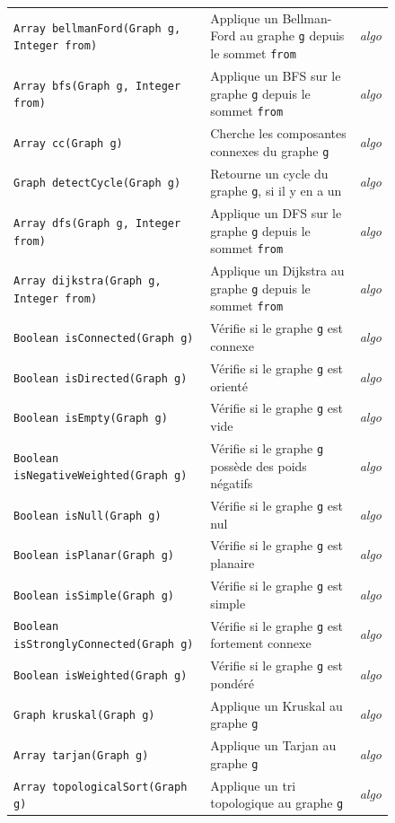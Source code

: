 \documentclass[french]{article}
\begin{document}
\begin{figure}[H]
\begin{longtable}{p{}p{}p{}}
					\texttt{Array bellmanFord(Graph g, Integer from)} & Applique un Bellman-Ford au graphe \texttt{g} depuis le sommet \texttt{from} & \textit{algo}\\
					\texttt{Array bfs(Graph g, Integer from)} & Applique un BFS sur le graphe \texttt{g} depuis le sommet \texttt{from} & \textit{algo}\\
					\texttt{Array cc(Graph g)} & Cherche les composantes connexes du graphe \texttt{g} & \textit{algo}\\
					\texttt{Graph detectCycle(Graph g)} & Retourne un cycle du graphe \texttt{g}, si il y en a un & \textit{algo}\\
					\texttt{Array dfs(Graph g, Integer from)} & Applique un DFS sur le graphe \texttt{g} depuis le sommet \texttt{from} & \textit{algo}\\
					\texttt{Array dijkstra(Graph g, Integer from)} & Applique un Dijkstra au graphe \texttt{g} depuis le sommet \texttt{from} & \textit{algo}\\
					\texttt{Boolean isConnected(Graph g)} & Vérifie si le graphe \texttt{g} est connexe & \textit{algo}\\
					\texttt{Boolean isDirected(Graph g)} & Vérifie si le graphe \texttt{g} est orienté & \textit{algo}\\
					\texttt{Boolean isEmpty(Graph g)} & Vérifie si le graphe \texttt{g} est vide & \textit{algo}\\
					\texttt{Boolean isNegativeWeighted(Graph g)} & Vérifie si le graphe \texttt{g} possède des poids négatifs & \textit{algo}\\
					\texttt{Boolean isNull(Graph g)} & Vérifie si le graphe \texttt{g} est nul & \textit{algo}\\
					\texttt{Boolean isPlanar(Graph g)} & Vérifie si le graphe \texttt{g} est planaire & \textit{algo}\\
					\texttt{Boolean isSimple(Graph g)} & Vérifie si le graphe \texttt{g} est simple & \textit{algo}\\
					\texttt{Boolean isStronglyConnected(Graph g)} & Vérifie si le graphe \texttt{g} est fortement connexe & \textit{algo}\\
					\texttt{Boolean isWeighted(Graph g)} & Vérifie si le graphe \texttt{g} est pondéré & \textit{algo}\\
					\texttt{Graph kruskal(Graph g)} & Applique un Kruskal au graphe \texttt{g} & \textit{algo}\\
					\texttt{Array tarjan(Graph g)} & Applique un Tarjan au graphe \texttt{g} & \textit{algo}\\
					\texttt{Array topologicalSort(Graph g)} & Applique un tri topologique au graphe \texttt{g} & \textit{algo}\\
				\end{longtable}
			\end{figure}
	
\end{document}
